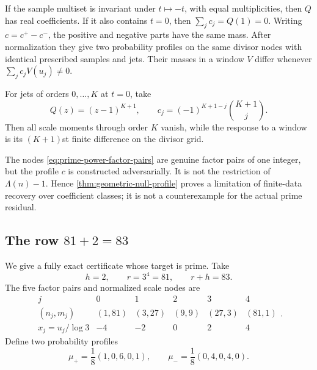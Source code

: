 If the sample multiset is invariant under $t\mapsto-t$, with equal
multiplicities, then $Q$ has real coefficients.  If it also contains
$t=0$, then
\(
 \sum_jc_j=Q(1)=0
\).
Writing $c=c^+-c^-$, the positive and negative parts have the same mass.
After normalization they give two probability profiles on the same divisor
nodes with identical prescribed samples and jets.  Their masses in a
window $V$ differ whenever
\(
 \sum_jc_jV(u_j)\ne0
\).

\begin{corollary}
\label{cor:zero-jets-finite-difference}
For jets of orders $0,\ldots,K$ at $t=0$, take
\begin{equation}\label{eq:finite-difference-coefficients}
 Q(z)=(z-1)^{K+1},
 \qquad
 c_j=(-1)^{K+1-j}\binom{K+1}{j}.
\end{equation}
Then all scale moments through order $K$ vanish, while the response to a
window is its $(K+1)$st finite difference on the divisor grid.
\end{corollary}

\begin{remark}
The nodes \eqref{eq:prime-power-factor-pairs} are genuine factor pairs of
one integer, but the profile $c$ is constructed adversarially.  It is not
the restriction of $\Lambda(n)-1$.  Hence
\cref{thm:geometric-null-profile} proves a limitation of finite-data
recovery over coefficient classes; it is not a counterexample for the
actual prime residual.
\end{remark}

\subsection{The row \texorpdfstring{$81+2=83$}{81+2=83}}

We give a fully exact certificate whose target is prime.  Take
\begin{equation}\label{eq:certificate-row}
 h=2,\qquad r=3^4=81,\qquad r+h=83.
\end{equation}
The five factor pairs and normalized scale nodes are
\begin{equation}\label{eq:certificate-nodes}
 \begin{array}{c|ccccc}
 j&0&1&2&3&4\\
 \hline
 (n_j,m_j)&(1,81)&(3,27)&(9,9)&(27,3)&(81,1)\\
 x_j=u_j/\log3&-4&-2&0&2&4
 \end{array}.
\end{equation}
Define two probability profiles
\begin{equation}\label{eq:certificate-profiles}
 \mu_+=\frac18(1,0,6,0,1),
 \qquad
 \mu_-=\frac18(0,4,0,4,0).
\end{equation}

